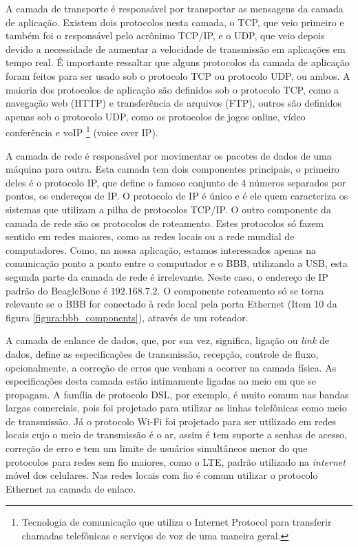 A camada de transporte é responsável por transportar as mensagens da camada de aplicação. Existem dois protocolos nesta camada, o TCP, que veio primeiro e também foi o responsável pelo acrônimo TCP/IP, e o UDP, que veio depois devido a necessidade de aumentar a velocidade de transmissão em aplicações em tempo real. É importante ressaltar que alguns protocolos da camada de aplicação foram feitos para ser usado sob o protocolo TCP ou protocolo UDP, ou ambos. A maioria dos protocolos de aplicação são definidos sob o protocolo TCP, como a navegação web (HTTP) e transferência de arquivos (FTP), outros são definidos apenas sob o protocolo UDP, como os protocolos de jogos online, vídeo conferência e voIP \footnote{Tecnologia de comunicação que utiliza o Internet Protocol para transferir chamadas telefônicas e serviços de voz de uma maneira geral.} (voice over IP).

A camada de rede é responsável por movimentar os pacotes de dados de uma máquina para outra. Esta camada tem dois componentes principais, o primeiro deles é o protocolo IP, que define o famoso conjunto de 4 números separados por pontos, os endereços de IP. O protocolo de IP é único e é ele quem caracteriza os sistemas que utilizam a pilha de protocolos TCP/IP. O outro componente da camada de rede são os protocolos de roteamento. Estes protocolos só fazem sentido em redes maiores, como as redes locais ou a rede mundial de computadores. Como, na nossa aplicação, estamos interessados apenas na comunicação ponto a ponto entre o computador e o BBB, utilizando a USB, esta segunda parte da camada de rede é irrelevante. Neste caso, o endereço de IP padrão do BeagleBone é $192.168.7.2$. O componente roteamento só se torna relevante se o BBB for conectado à rede local pela porta Ethernet (Item 10 da figura \ref{figura:bbb_components}), através de um roteador.

A camada de enlance de dados, que, por sua vez, significa, ligação ou \emph{link} de dados, define as especificações de transmissão, recepção, controle de fluxo, opcionalmente, a correção de erros que venham a ocorrer na camada física. As especificações desta camada estão intimamente ligadas ao meio em que se propagam. A família de protocolo DSL, por exemplo, é muito comum nas bandas largas comerciais, pois foi projetado para utilizar as linhas telefônicas como meio de transmissão. Já o protocolo Wi-Fi foi projetado para ser utilizado em redes locais cujo o meio de transmissão é o ar, assim é tem suporte a senhas de acesso, correção de erro e tem um limite de usuários simultâneos menor do que protocolos para redes sem fio maiores, como o LTE, padrão utilizado na \emph{internet} móvel dos celulares. Nas redes locais com fio é comum utilizar o protocolo Ethernet na camada de enlace.

